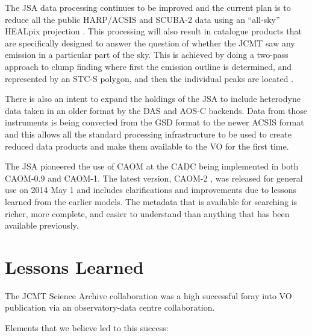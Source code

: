 \documentclass[final,authoryear,5p,times,twocolumn]{elsarticle}
\begin{document}
The JSA data processing continues to be improved
\citep{2014JCMTN35..19J} and the current plan is to reduce all the
public HARP/ACSIS and SCUBA-2 data using an ``all-sky'' HEALpix
projection \citep{2014SPIE9152-93,2014JCMTN35..20B}. This processing
will also result in catalogue products that are specifically designed
to answer the question of whether the JCMT saw any emission in a
particular part of the sky. This is achieved by doing a two-pass
approach to clump
finding where first the emission outline is determined, and represented
by an STC-S polygon, and then the individual peaks are located
\citep{2014JCMTN35..21G}.

There is also an intent to expand the holdings of the JSA to include
heterodyne data taken in an older format by the DAS
\citep{1986SPIE..598..134B} and AOS-C backends. Data from those
instruments is being converted from the GSD format \citep{GSD1999} to the newer ACSIS format and this
allows all the standard processing infrastructure to be used to create
reduced data products and make them available to the VO for the first
time.

The JSA pioneered the use of CAOM at the CADC being implemented in both
CAOM-0.9 and CAOM-1.  The latest version, CAOM-2
\citep{2013ASPC..475..159R,2012ASPC..461..339D},  was released for general
use on 2014 May 1 and includes clarifications and improvements due to
lessons learned from the earlier models.
The metadata that is available for searching is richer, more complete, and easier
to understand than anything that has been available previously.

\section{Lessons Learned}

The JCMT Science Archive collaboration was a high successful foray
into VO publication via an observatory-data centre collaboration.

Elements that we believe led to this success:
\end{document}
